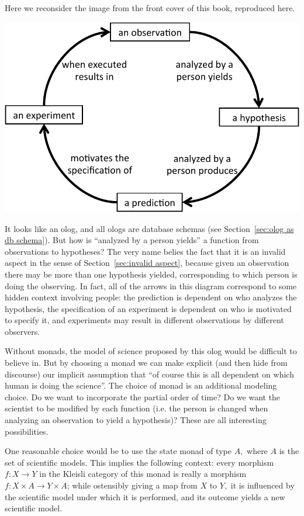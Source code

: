 \documentclass[../main/CT4S-EN-RU]{subfiles}
\begin{document}
\begin{remarkRUS}\label{rem:state monad}
\end{remarkRUS}

\begin{exampleENG}\label{ex:scientific method}
Here we reconsider the image from the front cover of this book, reproduced here.
\begin{center}
\includegraphics[width=.8\textwidth]{ScientificMethod}
\end{center}

It looks like an olog, and all ologs are database schemas (see Section~\ref{sec:olog as db schema}). But how is “analyzed by a person yields” a function from observations to hypotheses? The very name belies the fact that it is an invalid aspect in the sense of Section~\ref{sec:invalid aspect}, because given an observation there may be more than one hypothesis yielded, corresponding to which person is doing the observing. In fact, all of the arrows in this diagram correspond to some hidden context involving people: the prediction is dependent on who analyzes the hypothesis, the specification of an experiment is dependent on who is motivated to specify it, and experiments may result in different observations by different observers. 

Without monads, the model of science proposed by this olog would be difficult to believe in. But by choosing a monad we can make explicit (and then hide from discourse) our implicit assumption that “of course this is all dependent on which human is doing the science”. The choice of monad is an additional modeling choice. Do we want to incorporate the partial order of time? Do we want the scientist to be modified by each function (i.e. the person is changed when analyzing an observation to yield a hypothesis)? These are all interesting possibilities. 

One reasonable choice would be to use the state monad of type $A,$ where $A$ is the set of scientific models. This implies the following context: every morphism $f\colon X{→} Y$ in the Kleisli category of this monad is really a morphism $f\colon X\times A{→} Y\times A$; while ostensibly giving a map from $X$ to $Y,$ it is influenced by the scientific model under which it is performed, and its outcome yields a new scientific model. 


\end{exampleENG}
\end{document}
